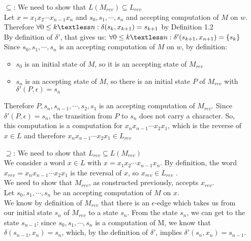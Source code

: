 \begin{itemize}
    \item[$\subseteq$:] We need to show that $L(M_{rev})\subseteq L_{rev}$\\
    Let $x=x_{1}x_{2}\cdots x_{n-1}x_{n}$ and $s_{0},s_{1},\cdots,s_{n}$ and accepting computation of $M$ on $w$.\\
    Therefore $\forall 0 \leq k \textless n: \delta(s_{k},x_{k+1})=s_{k+1}$  by Definition 1.2\\
    By definition of $\delta'$, that gives us: $\forall 0 \leq k \textless n: \delta'(s_{k+1}, x_{n+1}) = \left\{s_{k}\right\}$\\
    Since $s_{0},s_{1},\cdots,s_{n}$ is an accepting computation of $M$ on $w$, by definition:
    \begin{itemize}
        \item $s_{0}$ is an initial state of $M$, so it is an accepting state of $M_{rev}$
        \item $s_{n}$ is an accepting state of $M$, so there is an initial state $P$ of $M_{rev}$ with $\delta'(P,\epsilon)=s_{n}$
    \end{itemize}
    Therefore $P,s_{n},s_{n-1},\cdots, s_{2},s_{1}$ is an accepting computation of $M_{rev}$. Since $\delta'(P,\epsilon)=s_{n}$, the transition from $P$ to $s_{n}$ does not carry a character. So, this computation is a computation for $x_{n}x_{n-1}\cdots x_{2}x_{1}$, which is the reverse of $x \in L$ and therefore $x_{n}x_{n-1}\cdots x_{2}x_{1} \in L_{rev}$
    \item[$\supseteq$:] We need to show that $L_{rev}\subseteq L(M_{rev})$\\
    We consider a word $x \in L$ with $x=x_{1}x_{2}\cdots x_{n-1}x_{n}$. By definition, the word $x_{rev} = x_{n}x_{n-1}\cdots x_{2}x_{1}$ is the reversal of $x$, so $x_{rev} \in L_{rev}$ .\\
    We need to show that $M_{rev}$, as constructed previously, accepts $x_{rev}$.\\
    Let $s_{0}, s_{1},\cdots,s_{n}$ be an accepting computation of $M$ on $x$.\\
    We know by definition of $M_{rev}$ that there is an $\epsilon$-edge which takes us from our initial state $s_{n}$ of $M_{rev}$ to a state $s_{n}$. From the state $s_{n}$, we can get to the state $s_{n-1}$: since $s_{0}, s_{1}, \cdots, s_{n}$ is a computation of M, we know that $\delta(s_{n-1}, x_{n})=s_{n}$, which, by the definition of $\delta'$, implies $\delta'(s_{n},x_{n})=s_{n-1}$.\\

\end{itemize}
